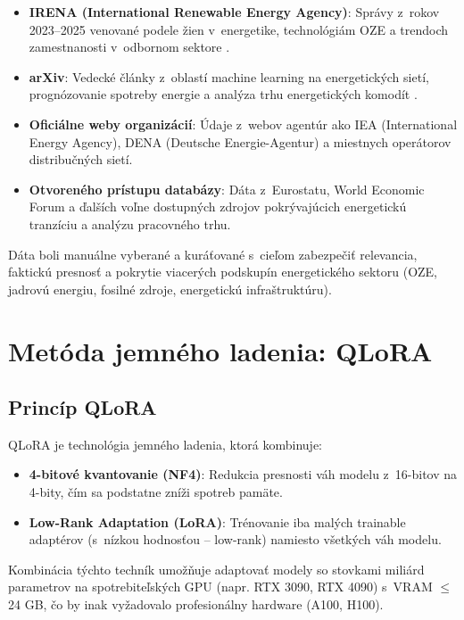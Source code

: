 \begin{itemize}
    \item \textbf{IRENA (International Renewable Energy Agency)}: Správy z~rokov 2023--2025 venované podele žien v~energetike, technológiám OZE a trendoch zamestnanosti v~odbornom sektore \cite{IRENA2025}.

    \item \textbf{arXiv}: Vedecké články z~oblastí machine learning na energetických sietí, prognózovanie spotreby energie a analýza trhu energetických komodít \cite{arXiv_energy}.

    \item \textbf{Oficiálne weby organizácií}: Údaje z~webov agentúr ako IEA (International Energy Agency), DENA (Deutsche Energie-Agentur) a miestnych operátorov distribučných sietí.

    \item \textbf{Otvoreného prístupu databázy}: Dáta z~Eurostatu, World Economic Forum a ďalších voľne dostupných zdrojov pokrývajúcich energetickú tranzíciu a analýzu pracovného trhu.
\end{itemize}

Dáta boli manuálne vyberané a kuráťované s~cieľom zabezpečiť relevancia, faktickú presnosť a pokrytie viacerých podskupín energetického sektoru (OZE, jadrovú energiu, fosilné zdroje, energetickú infraštruktúru).


\section{Metóda jemného ladenia: QLoRA}\label{sec:qlora}

\subsection{Princíp QLoRA}

QLoRA \cite{Dettmers2023QLoRA} je technológia jemného ladenia, ktorá kombinuje:
\begin{itemize}
    \item \textbf{4-bitové kvantovanie (NF4)}: Redukcia presnosti váh modelu z~16-bitov na 4-bity, čím sa podstatne zníži spotreb pamäte.
    \item \textbf{Low-Rank Adaptation (LoRA)}: Trénovanie iba malých trainable adaptérov (s~nízkou hodnosťou -- low-rank) namiesto všetkých váh modelu.
\end{itemize}

Kombinácia týchto techník umožňuje adaptovať modely so stovkami miliárd parametrov na spotrebiteľských GPU (napr. RTX 3090, RTX 4090) s~VRAM $\leq$ 24 GB, čo by inak vyžadovalo profesionálny hardware (A100, H100).

